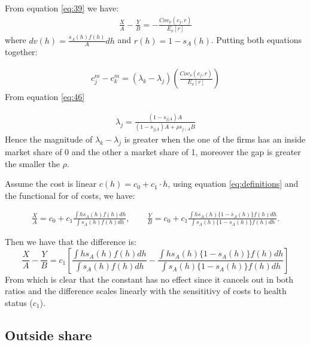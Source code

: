 \documentclass[12pt]{article}
\theoremstyle{plain}
\theoremstyle{plain}
\begin{document}
From equation \ref{eq:39} we have: 
\begin{align}
   \frac{X}{A} -\frac{Y}{B}=  -\frac{Cov_{\nu}(c_j,r)}{E_{\nu}[r]} 
\end{align} 
where $dv(h) = \frac{s_A(h)f(h)}{A}dh$ and $r(h) = 1-s_A(h)$. Putting both equations together: 

 \begin{align} 
    c^m_j -c^m_k = (\lambda_k - \lambda_j)\left(\frac{Cov_{\nu}(c_j,r)}{E_{\nu}[r]}\right)
\end{align}
From equation \ref{eq:46}

\begin{align}
    \lambda_j = \frac{(1-s_{j|A})A}{(1-s_{j|A})A+\rho s_{j\mid A}B} 
\end{align}
Hence the magnitude of $\lambda_k - \lambda_j$ is greater when the one of the firms has an inside market share of 0 and the other a market share of 1, moreover the gap is greater the smaller the $\rho$. 


Assume the cost is linear $c(h) = c_0 + c_1 \cdot h$, using equation \ref{eq:definitions} and the functional for of costs, we have: 

\begin{align}
    \frac{X}{A} = c_0 + c_1 \frac{\int h s_A(h)f(h)dh}{\int s_A(h)f(h)dh}, \qquad \frac{Y}{B} = c_0 + c_1 \frac{\int h s_A(h)\{1-s_A(h)\}f(h)dh}{\int s_A(h)\{1-s_A(h)\}f(h)dh}.
\end{align}

Then we have that the difference is: 
\[
 \frac{X}{A} - \frac{Y}{B} = c_1 \left[ \frac{\int h s_A(h)f(h)dh}{\int s_A(h)f(h)dh} - \frac{\int h s_A(h)\{1-s_A(h)\}f(h)dh}{\int s_A(h)\{1-s_A(h)\}f(h)dh} \right]
\]
From which is clear that the constant has no effect since it cancels out in both ratios and the difference scales linearly with the sensititivy of costs to health status ($c_1$). 








\subsection{Outside share}\label{sec:appendix4}
\end{document}
